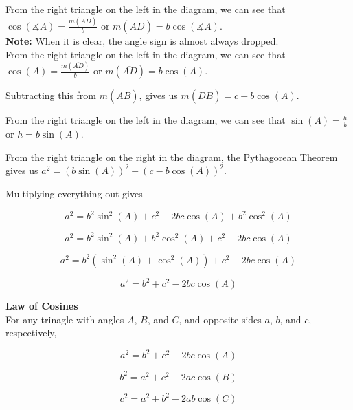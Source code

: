 \documentclass{ximera}
\begin{document}
From the right triangle on the left in the diagram, we can see that $\cos(\measuredangle A) = \frac{m(\overline{AD})}{b}$ or $m(\overline{AD}) = b \cos(\measuredangle A)$. \\


\textbf{Note:} When it is clear, the angle sign is almost always dropped. \\


From the right triangle on the left in the diagram, we can see that $\cos(A) = \frac{m(\overline{AD})}{b}$ or $m(\overline{AD}) = b \cos(A)$.


Subtracting this from $m(\overline{AB})$, gives us $m(\overline{DB}) = c - b \cos(A)$.


From the right triangle on the left in the diagram, we can see that $\sin(A) = \frac{h}{b}$ or $h = b \sin(A)$.




From the right triangle on the right in the diagram, the Pythagorean Theorem gives us $a^2 = (b \sin(A))^2 + (c - b \cos(A))^2$.


Multiplying everything out gives


\[    a^2 = b^2 \sin^2(A) +  c^2  - 2 b c \cos(A) + b^2 \cos^2(A)  \]


\[    a^2 = b^2 \sin^2(A) + b^2 \cos^2(A) +  c^2  - 2 b c \cos(A)   \]


\[    a^2 = b^2 (\sin^2(A) + \cos^2(A)) +  c^2  - 2 b c \cos(A)   \]


\[    a^2 = b^2  +  c^2  - 2 b c \cos(A)   \]












\begin{theorem}  \textbf{\textcolor{green!50!black}{Law of Cosines}}  \\



For any trinagle with angles $A$, $B$, and $C$, and opposite sides $a$, $b$, and $c$, respectively, 


\[    a^2 = b^2  +  c^2  - 2 b c \cos(A)   \]

\[    b^2 = a^2  +  c^2  - 2 a c \cos(B)   \]

\[    c^2 = a^2  +  b^2  - 2 a b \cos(C)   \]


\end{theorem}
\end{document}
